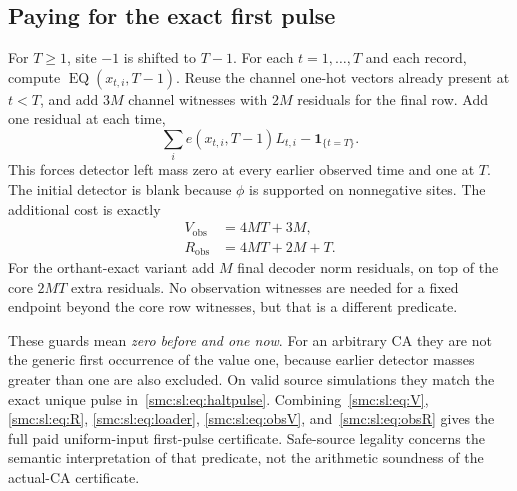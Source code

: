 \documentclass[11pt,letterpaper]{article}
\numberwithin{equation}{section}
\theoremstyle{definition}
\theoremstyle{remark}
\newcommand{\ind}[1]{\mathbf 1_{\{#1\}}}
\newcommand{\EQ}{\operatorname{EQ}}
\begin{document}
\subsection{Paying for the exact first pulse}
For $T\ge1$, site $-1$ is shifted to $T-1$. For each $t=1,\ldots,T$ and each record, compute $\EQ(x_{t,i},T-1)$. Reuse the channel one-hot vectors already present at $t<T$, and add $3M$ channel witnesses with $2M$ residuals for the final row. Add one residual at each time,
\begin{equation}\label{smc:sl:eq:observe}
 \sum_i e(x_{t,i},T-1)L_{t,i}-\ind{t=T}.
\end{equation}
This forces detector left mass zero at every earlier observed time and one at $T$. The initial detector is blank because $\phi$ is supported on nonnegative sites. The additional cost is exactly
\begin{align}
 V_{\mathrm{obs}}&=4MT+3M,\label{smc:sl:eq:obsV}\\
 R_{\mathrm{obs}}&=4MT+2M+T.\label{smc:sl:eq:obsR}
\end{align}
For the orthant-exact variant add $M$ final decoder norm residuals, on top of the core $2MT$ extra residuals. No observation witnesses are needed for a fixed endpoint beyond the core row witnesses, but that is a different predicate.

These guards mean \emph{zero before and one now}. For an arbitrary CA they are not the generic first occurrence of the value one, because earlier detector masses greater than one are also excluded. On valid source simulations they match the exact unique pulse in~\eqref{smc:sl:eq:haltpulse}. Combining~\eqref{smc:sl:eq:V}, \eqref{smc:sl:eq:R}, \eqref{smc:sl:eq:loader}, \eqref{smc:sl:eq:obsV}, and~\eqref{smc:sl:eq:obsR} gives the full paid uniform-input first-pulse certificate. Safe-source legality concerns the semantic interpretation of that predicate, not the arithmetic soundness of the actual-CA certificate.
\end{document}
